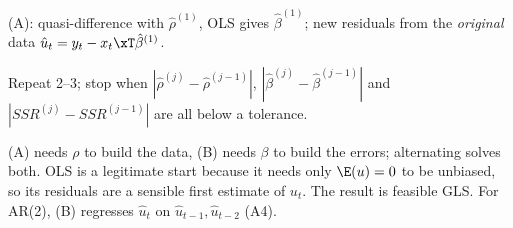 \begin{solbox}
\begin{flatnum}
  \item (A): quasi-difference with $\hat\rho^{(1)}$, OLS gives $\hat\beta^{(1)}$; new residuals from the \emph{original} data $\hat u_{t}=y_{t}-x_{t}\xT\hat\beta^{(1)}$.
  \item Repeat 2--3; stop when $|\hat\rho^{(j)}-\hat\rho^{(j-1)}|$, $|\hat\beta^{(j)}-\hat\beta^{(j-1)}|$ and $|SSR^{(j)}-SSR^{(j-1)}|$ are all below a tolerance.
\end{flatnum}
\begin{why}\Why (A) needs $\rho$ to build the data, (B) needs $\beta$ to build the errors; alternating solves both. OLS is a legitimate start because it needs only $\E(u)=0$ to be unbiased,
so its residuals are a sensible first estimate of $u_{t}$. The result is feasible GLS. For AR(2), (B) regresses $\hat u_{t}$ on $\hat u_{t-1},\hat u_{t-2}$ (A4).\end{why}
\end{solbox}

